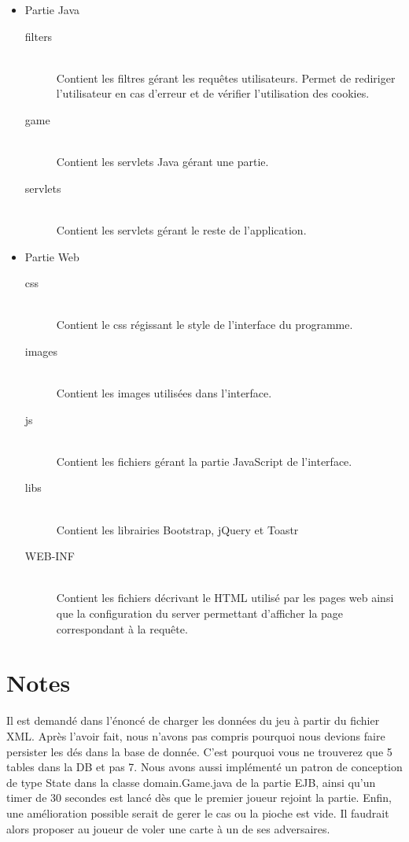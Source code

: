 \documentclass[11pt]{scrreprt}
\begin{document}
    \begin{itemize}
        \item Partie Java
        \begin{description}
            \item[filters]\hfill \\ Contient les filtres gérant les requêtes utilisateurs. Permet de rediriger l'utilisateur en cas d'erreur et de vérifier l'utilisation des cookies.
            \item[game]\hfill \\ Contient les servlets Java gérant une partie.
            \item[servlets]\hfill \\ Contient les servlets gérant le reste de l'application.
        \end{description}
        \item Partie Web
        \begin{description}
            \item[css]\hfill \\ Contient le css régissant le style de l'interface du programme.
            \item[images]\hfill \\ Contient les images utilisées dans l'interface.
            \item[js]\hfill \\ Contient les fichiers gérant la partie JavaScript de l'interface.
            \item[libs]\hfill \\ Contient les librairies Bootstrap, jQuery et Toastr
            \item[WEB-INF]\hfill \\ Contient les fichiers décrivant le HTML utilisé par les pages web ainsi que la configuration du server permettant d'afficher la page correspondant à la requête.
        \end{description}
    \end{itemize}
    \chapter{Notes}
    Il est demandé dans l'énoncé de charger les données du jeu à partir du fichier XML. Après l'avoir fait, nous n'avons pas compris pourquoi nous devions faire persister les dés dans la base de donnée. C'est pourquoi vous ne trouverez que 5 tables dans la DB et pas 7. 
    Nous avons aussi implémenté un patron de conception de type \og State\fg{} dans la classe domain.Game.java de la partie EJB, ainsi qu'un timer de 30 secondes est lancé dès que le premier joueur rejoint la partie.
    Enfin, une amélioration possible serait de gerer le cas ou la pioche est vide. Il faudrait alors proposer au joueur de voler une carte à un de ses adversaires. 
\end{document}
